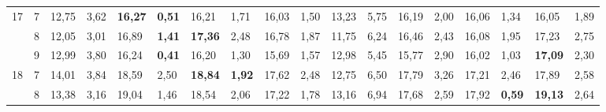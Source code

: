 \documentclass[conference]{IEEEtran}
\begin{document}
\begin{table}[]
\begin{tabular}{|cl|ll|ll|ll|ll|ll|ll|ll|ll|}
		\multicolumn{1}{|c|}{\multirow{3}{*}{17}} & 7          & \multicolumn{1}{l|}{12,75}         & 3,62          & \multicolumn{1}{l|}{\textbf{16,27}} & \textbf{0,51} & \multicolumn{1}{l|}{16,21}          & 1,71          & \multicolumn{1}{l|}{16,03}         & 1,50          & \multicolumn{1}{l|}{13,23}                & 5,75 & \multicolumn{1}{l|}{16,19}          & 2,00 & \multicolumn{1}{l|}{16,06}          & 1,34          & \multicolumn{1}{l|}{16,05}          & 1,89 \\ \cline{2-18} 
		\multicolumn{1}{|c|}{}                    & 8          & \multicolumn{1}{l|}{12,05}         & 3,01          & \multicolumn{1}{l|}{16,89}          & \textbf{1,41} & \multicolumn{1}{l|}{\textbf{17,36}} & 2,48          & \multicolumn{1}{l|}{16,78}         & 1,87          & \multicolumn{1}{l|}{11,75}                & 6,24 & \multicolumn{1}{l|}{16,46}          & 2,43 & \multicolumn{1}{l|}{16,08}          & 1,95          & \multicolumn{1}{l|}{17,23}          & 2,75 \\ \cline{2-18} 
		\multicolumn{1}{|c|}{}                    & 9          & \multicolumn{1}{l|}{12,99}         & 3,80          & \multicolumn{1}{l|}{16,24}          & \textbf{0,41} & \multicolumn{1}{l|}{16,20}          & 1,30          & \multicolumn{1}{l|}{15,69}         & 1,57          & \multicolumn{1}{l|}{12,98}                & 5,45 & \multicolumn{1}{l|}{15,77}          & 2,90 & \multicolumn{1}{l|}{16,02}          & 1,03          & \multicolumn{1}{l|}{\textbf{17,09}} & 2,30 \\ \hline
		\multicolumn{1}{|c|}{\multirow{3}{*}{18}} & 7          & \multicolumn{1}{l|}{14,01}         & 3,84          & \multicolumn{1}{l|}{18,59}          & 2,50          & \multicolumn{1}{l|}{\textbf{18,84}} & \textbf{1,92} & \multicolumn{1}{l|}{17,62}         & 2,48          & \multicolumn{1}{l|}{12,75}                & 6,50 & \multicolumn{1}{l|}{17,79}          & 3,26 & \multicolumn{1}{l|}{17,21}          & 2,46          & \multicolumn{1}{l|}{17,89}          & 2,58 \\ \cline{2-18} 
		\multicolumn{1}{|c|}{}                    & 8          & \multicolumn{1}{l|}{13,38}         & 3,16          & \multicolumn{1}{l|}{19,04}          & 1,46          & \multicolumn{1}{l|}{18,54}          & 2,06          & \multicolumn{1}{l|}{17,22}         & 1,78          & \multicolumn{1}{l|}{13,16}                & 6,94 & \multicolumn{1}{l|}{17,68}          & 2,59 & \multicolumn{1}{l|}{17,92}          & \textbf{0,59} & \multicolumn{1}{l|}{\textbf{19,13}} & 2,64 \\ \cline{2-18} 

\end{tabular}
\end{table}
\end{document}
